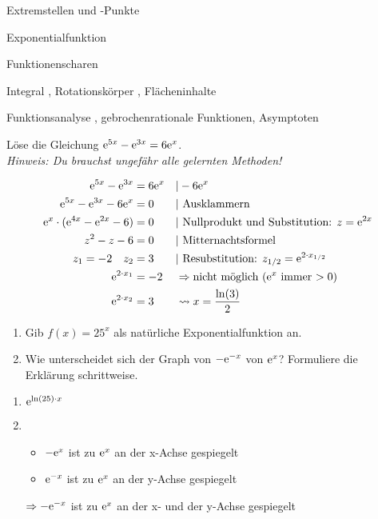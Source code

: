 


\begin{inhalt}
	\item Extremstellen und -Punkte 
	\item Exponentialfunktion 
	\item Funktionenscharen 
  \item Integral , Rotationskörper , Flächeninhalte 
	\item Funktionsanalyse , gebrochenrationale Funktionen, Asymptoten 
\end{inhalt}

Löse die Gleichung $\mathrm{e}^{5x}-\mathrm{e}^{3x}=6\mathrm{e}^x$.\\
\textit{Hinweis: Du brauchst ungefähr alle gelernten Methoden!}
\begin{lsg}{}
	\begin{multicols}{2}
	\begin{align*}
		\e^{5x}-\e^{3x}&=6\e^x &&|-6\e^x\\
		\e^{5x}-\e^{3x}-6\e^x&=0 &&|\ \text{Ausklammern}\\
		\e^x\cdot(\e^{4x}-\e^{2x}-6)&=0 &&|\ \text{Nullprodukt und Substitution: } z=\e^{2x}\\
		z^2-z-6&=0 &&|\ \text{Mitternachtsformel}\\
		z_1=-2 \quad z_2&=3&&|\ \text{Resubstitution: } z_{1/2}=\e^{2\cdot x_{1/2}}\\
		\e^{2\cdot x_1}&=-2 &&\Rightarrow \text{nicht möglich ($\e^x$ immer $>0$)}\\
		\e^{2\cdot x_2}&= 3 &&\rightsquigarrow x=\frac{\ln(3)}{2}
	\end{align*}
	\end{multicols}
\end{lsg}


\begin{enumerate}
	\item Gib $f(x)=25^x$ als natürliche Exponentialfunktion an.
	\item	Wie unterscheidet sich der Graph von $-\mathrm{e}^{-x}$ von $\mathrm{e}^x$? Formuliere die Erklärung schrittweise.

\end{enumerate}
\begin{lsg}{}
	\begin{enumerate}
		\item $\mathrm{e}^{\ln(25)\cdot x}$
		\item 	\begin{itemize}
					\item $-\mathrm{e}^x$ ist zu $ \mathrm{e}^x$ an der x-Achse gespiegelt
					\item $\mathrm{e}^{-x}$ ist zu $\mathrm{e}^x$ an der y-Achse gespiegelt
				\end{itemize}
				$\Rightarrow -\mathrm{e}^{-x}$ ist zu $\mathrm{e}^x$ an der x- und der y-Achse gespiegelt
	\end{enumerate}
\end{lsg}

